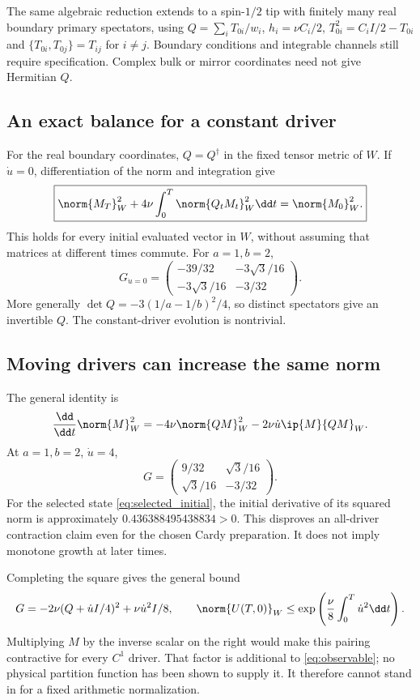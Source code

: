 The same algebraic reduction extends to a spin-$1/2$ tip with finitely
many real boundary primary spectators, using
$Q=\sum_iT_{0i}/w_i$, $h_i=\nu C_i/2$,
$T_{0i}^2=C_iI/2-T_{0i}$ and
$\{T_{0i},T_{0j}\}=T_{ij}$ for $i\ne j$.
Boundary conditions and integrable channels still require specification.
Complex bulk or mirror coordinates need not give Hermitian $Q$.

\subsection{An exact balance for a constant driver}

For the real boundary coordinates, $Q=Q^\dagger$ in the fixed tensor
metric of $W$. If $\dot u=0$, differentiation of the norm and integration
give
\begin{equation}
 \boxed{\norm{M_T}_W^2+4\nu\int_0^T\norm{Q_tM_t}_W^2\dd t
 =\norm{M_0}_W^2.}
 \label{eq:tensor_balance}
\end{equation}
This holds for every initial evaluated vector in $W$, without assuming
that matrices at different times commute. For $a=1,b=2$,
\begin{equation}
 G_{\dot u=0}=\begin{pmatrix}
 -39/32&-3\sqrt3/16\\-3\sqrt3/16&-3/32
 \end{pmatrix}.
\end{equation}
More generally $\det Q=-3(1/a-1/b)^2/4$, so distinct spectators give
an invertible $Q$. The constant-driver evolution is nontrivial.

\subsection{Moving drivers can increase the same norm}

The general identity is
\begin{equation}
 \frac{\dd}{\dd t}\norm{M}_W^2
 =-4\nu\norm{QM}_W^2-2\nu\dot u\ip{M}{QM}_W.
 \label{eq:moving_balance}
\end{equation}
At $a=1,b=2$, $\dot u=4$,
\begin{equation}
 G=\begin{pmatrix}9/32&\sqrt3/16\\\sqrt3/16&-3/32\end{pmatrix}.
\end{equation}
For the selected state \eqref{eq:selected_initial}, the initial derivative
of its squared norm is approximately $0.436388495438834>0$.
This disproves an all-driver contraction claim even for the chosen Cardy
preparation. It does not imply monotone growth at later times.

Completing the square gives the general bound
\begin{equation}
 G=-2\nu(Q+\dot uI/4)^2+\nu\dot u^2I/8,
 \qquad
 \norm{U(T,0)}_W\le
 \exp\left(\frac\nu8\int_0^T\dot u^2\dd t\right).
 \label{eq:driver_bound}
\end{equation}
Multiplying $M$ by the inverse scalar on the right would make this
pairing contractive for every $C^1$ driver. That factor is additional to
\eqref{eq:observable}; no physical partition function has been shown to
supply it. It therefore cannot stand in for a fixed arithmetic normalization.
